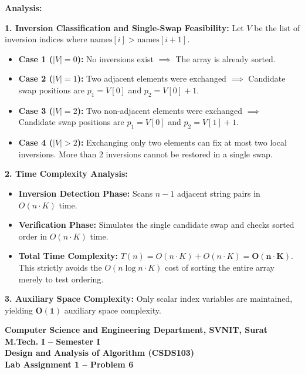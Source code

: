 \documentclass[12pt]{article}
\begin{document}
\newpage

\textbf{Analysis:}

\textbf{1. Inversion Classification and Single-Swap Feasibility:}
Let $V$ be the list of inversion indices where $\text{names}[i] > \text{names}[i+1]$.
\begin{itemize}
    \item \textbf{Case 1 ($|V| = 0$):} No inversions exist $\implies$ The array is already sorted.
    \item \textbf{Case 2 ($|V| = 1$):} Two adjacent elements were exchanged $\implies$ Candidate swap positions are $p_1 = V[0]$ and $p_2 = V[0] + 1$.
    \item \textbf{Case 3 ($|V| = 2$):} Two non-adjacent elements were exchanged $\implies$ Candidate swap positions are $p_1 = V[0]$ and $p_2 = V[1] + 1$.
    \item \textbf{Case 4 ($|V| > 2$):} Exchanging only two elements can fix at most two local inversions. More than 2 inversions cannot be restored in a single swap.
\end{itemize}

\textbf{2. Time Complexity Analysis:}
\begin{itemize}
    \item \textbf{Inversion Detection Phase:} Scans $n-1$ adjacent string pairs in $O(n \cdot K)$ time.
    \item \textbf{Verification Phase:} Simulates the single candidate swap and checks sorted order in $O(n \cdot K)$ time.
    \item \textbf{Total Time Complexity:} $T(n) = O(n \cdot K) + O(n \cdot K) = \mathbf{O(n \cdot K)}$. This strictly avoids the $O(n \log n \cdot K)$ cost of sorting the entire array merely to test ordering.
\end{itemize}

\textbf{3. Auxiliary Space Complexity:}
Only scalar index variables are maintained, yielding $\mathbf{O(1)}$ auxiliary space complexity.

\newpage


\begin{center}
\textbf{Computer Science and Engineering Department, SVNIT, Surat}\\
\textbf{M.Tech. I -- Semester I}\\
\textbf{Design and Analysis of Algorithm (CSDS103)}\\
\textbf{Lab Assignment 1 -- Problem 6}
\end{center}
\end{document}
